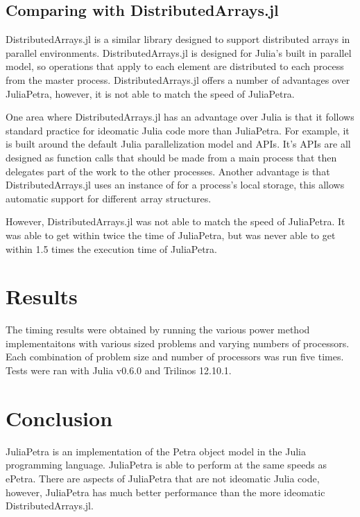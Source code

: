 \documentclass[acmsmall]{acmart}
\newcommand{\juliaSnippet}[1]{\texttt{\detokenize{#1}}}
\begin{document}
\subsection{Comparing with DistributedArrays.jl}

DistributedArrays.jl is a similar library designed to support distributed arrays in parallel environments.
\cite{DAGithub}
DistributedArrays.jl is designed for Julia's built in parallel model, so operations that apply to
each element are distributed to each process from the master process.
DistributedArrays.jl offers a number of advantages over JuliaPetra, however, it is not able to
match the speed of JuliaPetra.

One area where DistributedArrays.jl has an advantage over Julia is that it follows standard
practice for ideomatic Julia code more than JuliaPetra.
For example, it is built around the default Julia parallelization model and APIs.
It's APIs are all designed as function calls that should be made from a main process that
then delegates part of the work to the other processes. %
Another advantage is that DistributedArrays.jl uses an instance of \juliaSnippet{AbstractArray}
for a process's local storage, this allows automatic support for different array structures.

However, DistributedArrays.jl was not able to match the speed of JuliaPetra.
It was able to get within twice the time of JuliaPetra, but was never able to get within 1.5 times
the execution time of JuliaPetra.

\section{Results}


The timing results were obtained by running the various power method implementaitons
with various sized problems and varying numbers of processors.
Each combination of problem size and number of processors was run five times.
Tests were ran with Julia v0.6.0 and Trilinos 12.10.1.


\section{Conclusion}

JuliaPetra is an implementation of the Petra object model in the Julia programming language.
JuliaPetra is able to perform at the same speeds as ePetra.
There are aspects of JuliaPetra that are not ideomatic Julia code, however, JuliaPetra has much
better performance than the more ideomatic DistributedArrays.jl.



\end{document}
